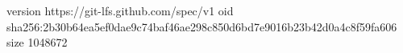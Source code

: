 version https://git-lfs.github.com/spec/v1
oid sha256:2b30b64ea5ef0dae9c74baf46ae298c850d6bd7e9016b23b42d0a4c8f59fa606
size 1048672
